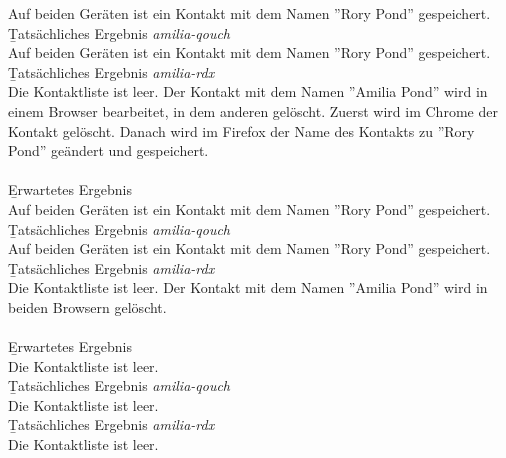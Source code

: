 Auf beiden Geräten ist ein Kontakt mit dem Namen ''Rory Pond'' gespeichert.\\
\b{Tatsächliches Ergebnis \it{amilia-qouch}}\\
Auf beiden Geräten ist ein Kontakt mit dem Namen ''Rory Pond'' gespeichert.\\
\b{Tatsächliches Ergebnis \it{amilia-rdx}}\\
Die Kontaktliste ist leer.
%
Der Kontakt mit dem Namen ''Amilia Pond'' wird in einem Browser bearbeitet, in dem anderen gelöscht.
Zuerst wird im Chrome der Kontakt gelöscht. 
Danach wird im Firefox der Name des Kontakts zu ''Rory Pond'' geändert und gespeichert.\\\\
%
\b{Erwartetes Ergebnis}\\
Auf beiden Geräten ist ein Kontakt mit dem Namen ''Rory Pond'' gespeichert.\\
\b{Tatsächliches Ergebnis \it{amilia-qouch}}\\
Auf beiden Geräten ist ein Kontakt mit dem Namen ''Rory Pond'' gespeichert.\\
\b{Tatsächliches Ergebnis \it{amilia-rdx}}\\
Die Kontaktliste ist leer.
%
Der Kontakt mit dem Namen ''Amilia Pond'' wird in beiden Browsern gelöscht.\\\\
\b{Erwartetes Ergebnis}\\
Die Kontaktliste ist leer.\\
\b{Tatsächliches Ergebnis \it{amilia-qouch}}\\
Die Kontaktliste ist leer.\\
\b{Tatsächliches Ergebnis \it{amilia-rdx}}\\
Die Kontaktliste ist leer.